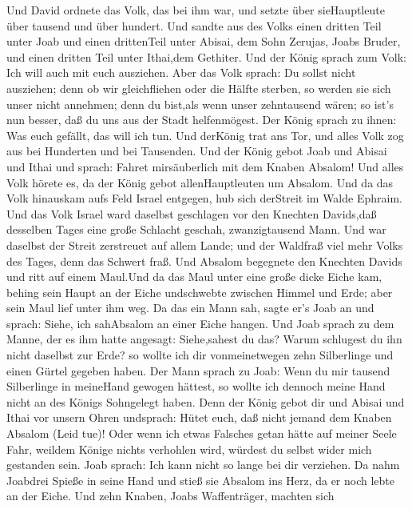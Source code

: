  Und David ordnete das Volk, das bei ihm war, und setzte
über sieHauptleute über tausend und über hundert.  Und
sandte aus des Volks einen dritten Teil unter Joab und einen drittenTeil
unter Abisai, dem Sohn Zerujas, Joabs Bruder, und einen dritten Teil
unter Ithai,dem Gethiter. Und der König sprach zum Volk: Ich will auch
mit euch ausziehen.  Aber das Volk sprach: Du sollst nicht
ausziehen; denn ob wir gleichfliehen oder die Hälfte sterben, so werden
sie sich unser nicht annehmen; denn du bist,als wenn unser zehntausend
wären; so ist's nun besser, daß du uns aus der Stadt helfenmögest.
 Der König sprach zu ihnen: Was euch gefällt, das will ich
tun. Und derKönig trat ans Tor, und alles Volk zog aus bei Hunderten und
bei Tausenden.  Und der König gebot Joab und Abisai und
Ithai und sprach: Fahret mirsäuberlich mit dem Knaben Absalom! Und alles
Volk hörete es, da der König gebot allenHauptleuten um Absalom.
 Und da das Volk hinauskam aufs Feld Israel entgegen, hub
sich derStreit im Walde Ephraim.  Und das Volk Israel ward
daselbst geschlagen vor den Knechten Davids,daß desselben Tages eine
große Schlacht geschah, zwanzigtausend Mann.  Und war
daselbst der Streit zerstreuet auf allem Lande; und der Waldfraß viel
mehr Volks des Tages, denn das Schwert fraß.  Und Absalom
begegnete den Knechten Davids und ritt auf einem Maul.Und da das Maul
unter eine große dicke Eiche kam, behing sein Haupt an der Eiche
undschwebte zwischen Himmel und Erde; aber sein Maul lief unter ihm weg.
 Da das ein Mann sah, sagte er's Joab an und sprach: Siehe,
ich sahAbsalom an einer Eiche hangen.  Und Joab sprach zu
dem Manne, der es ihm hatte angesagt: Siehe,sahest du das? Warum
schlugest du ihn nicht daselbst zur Erde? so wollte ich dir
vonmeinetwegen zehn Silberlinge und einen Gürtel gegeben haben.
 Der Mann sprach zu Joab: Wenn du mir tausend Silberlinge
in meineHand gewogen hättest, so wollte ich dennoch meine Hand nicht an
des Königs Sohngelegt haben. Denn der König gebot dir und Abisai und
Ithai vor unsern Ohren undsprach: Hütet euch, daß nicht jemand dem
Knaben Absalom (Leid tue)!  Oder wenn ich etwas Falsches
getan hätte auf meiner Seele Fahr, weildem Könige nichts verhohlen wird,
würdest du selbst wider mich gestanden sein.  Joab sprach:
Ich kann nicht so lange bei dir verziehen. Da nahm Joabdrei Spieße in
seine Hand und stieß sie Absalom ins Herz, da er noch lebte an der
Eiche.  Und zehn Knaben, Joabs Waffenträger, machten sich
